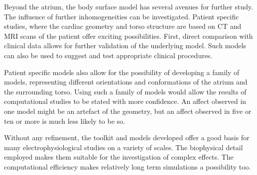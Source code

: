 Beyond the atrium, the body surface model has several avenues for further study.
The influence of further inhomogeneities can be investigated.
Patient specific studies, where the cardiac geometry and torso structure are
based on CT and MRI scans of the patient offer exciting possibilities.
First, direct comparison with clinical data allows for further validation of the
underlying model.
Such models can also be used to suggest and test appropriate clinical
procedures.

Patient specific models also allow for the possibility of developing a family of models,
representing different orientations and conformations of the atrium and the
surrounding torso.
Using such a family of models would allow the results of computational studies
to be stated with more confidence.
An affect observed in one model might be an artefact of the geometry, but an
affect observed in five or ten or more is much less likely to be so.

Without any refinement, the toolkit and models developed offer a good basis for
many electrophysiological studies on a variety of scales.
The biophysical detail employed makes them suitable for the investigation of
complex effects.
The computational efficiency makes relatively long term simulations a
possibility too.

